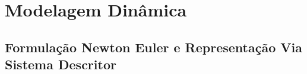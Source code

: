 \documentclass[a4paper,10pt]{article}
\begin{document}
%
%

\newcommand{\surname}{RAFFO}

\newcommand{\initials}{JMC}

\newcommand{\reportnumber}{1}

\newcommand{\reportversion}{1}

\newcommand{\reporttitle}{\textbf{Parallel Distributed Compensator(PDC) de um Pendulo Invertido Via Representação Takagi-Sugeno}}

\newcommand{\registrationnumber}{2016086496}

\newcommand{\studentname}{Jonatan Mota Campos}

\newcommand{\advisorname}{Guilherme Vianna Raffo}

\newcommand{\coadvisorname}{}



\newpage
\tableofcontents
\thispagestyle{empty}

\newpage
{}
\newcommand{\zero}{\bm{\emptyset}}
\newcommand{\Af}{\bm{A}(\eta(x))}
\newcommand{\Buf}{\bm{B_u}(\eta(x))}
\newcommand{\Baf}{\bm{B_{\alpha}}(\eta(x))}
\newcommand{\Ef}{\bm{E}(\eta(x))}
\newcommand{\Kf}{\bm{K}(\eta(x))}
\newcommand{\Y}{\bm{\mathcal{Y}}(\eta(x))}
\newcommand{\X}{\bm{\mathcal{X}}}
\section{Modelagem Dinâmica}
\subsection{Formulação Newton Euler e Representação Via Sistema Descritor}
\end{document}
